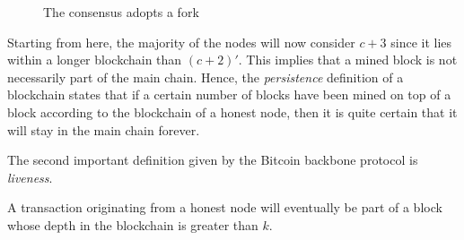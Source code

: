 \documentclass[11pt]{report}
\begin{document}
                \begin{figure}[ht]
                    \centering
                    \caption{The consensus adopts a fork}
                    \label{figure:acceptedfork}
                \end{figure}
                
                Starting from here, the majority of the nodes will now consider \(c+3\) since it lies within a longer blockchain than \((c+2)'\). This implies that a mined block is not necessarily part of the main chain. Hence, the \textit{persistence} definition of a blockchain states that if a certain number of blocks have been mined on top of a block according to the blockchain of a honest node, then it is quite certain that it will stay in the main chain forever.
                
                The second important definition given by the Bitcoin backbone protocol is \textit{liveness}.
                
                \begin{Definition}
                    A transaction originating from a honest node will eventually be part of a block whose depth in the blockchain is greater than \(k\).
                \end{Definition}
\end{document}
